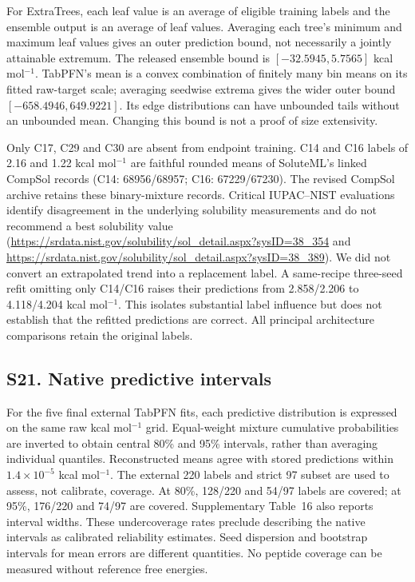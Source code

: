For ExtraTrees, each leaf value is an average of eligible training labels and the
ensemble output is an average of leaf values. Averaging each tree's minimum and
maximum leaf values gives an outer prediction bound, not necessarily a jointly
attainable extremum. The released ensemble bound is $[-32.5945,5.7565]$
kcal mol$^{-1}$. TabPFN's mean is a convex combination of finitely many bin means
on its fitted raw-target scale; averaging seedwise extrema gives the wider outer
bound $[-658.4946,649.9221]$. Its edge distributions can have unbounded tails
without an unbounded mean. Changing this bound is not a proof of size extensivity.

Only C17, C29 and C30 are absent from endpoint training. C14 and C16 labels of
2.16 and 1.22 kcal mol$^{-1}$ are faithful rounded means of SoluteML's linked
CompSol records (C14: 68956/68957; C16: 67229/67230). The revised CompSol archive
retains these binary-mixture records. Critical IUPAC--NIST evaluations identify
disagreement in the underlying solubility measurements and do not recommend a
best solubility value (\url{https://srdata.nist.gov/solubility/sol_detail.aspx?sysID=38_354}
and \url{https://srdata.nist.gov/solubility/sol_detail.aspx?sysID=38_389}).
We did not convert an extrapolated trend into a replacement label. A same-recipe
three-seed refit omitting only C14/C16 raises their predictions from 2.858/2.206
to 4.118/4.204 kcal mol$^{-1}$. This isolates substantial label influence but
does not establish that the refitted predictions are correct. All principal
architecture comparisons retain the original labels.

\subsection*{S21. Native predictive intervals}

For the five final external TabPFN fits, each predictive distribution is expressed
on the same raw kcal mol$^{-1}$ grid. Equal-weight mixture cumulative probabilities
are inverted to obtain central 80\% and 95\% intervals, rather than averaging
individual quantiles. Reconstructed means agree with stored predictions within
$1.4\times10^{-5}$ kcal mol$^{-1}$. The external 220 labels and strict 97 subset
are used to assess, not calibrate, coverage. At 80\%, 128/220 and 54/97 labels
are covered; at 95\%, 176/220 and 74/97 are covered. Supplementary Table~16 also
reports interval widths. These undercoverage rates preclude describing the native
intervals as calibrated reliability estimates. Seed dispersion and bootstrap
intervals for mean errors are different quantities. No peptide coverage can be
measured without reference free energies.
